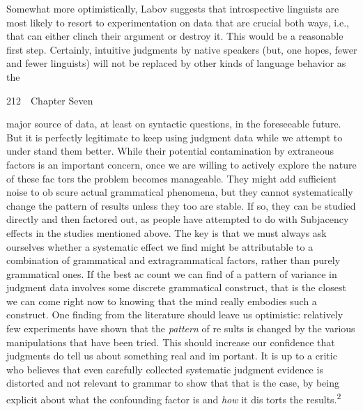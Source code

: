 \begin{styleStandard}
Somewhat more optimistically, Labov suggests that introspective linguists are most likely to resort to experimentation on data that are crucial both ways, i.e., that can either clinch their argument or destroy it. This would be a reasonable first step. Certainly, intuitive judgments by native speakers (but, one hopes, fewer and fewer linguists) will not be replaced by other kinds of language behavior as the
\end{styleStandard}


\clearpage\setcounter{page}{1}\begin{styleStandard}
212\ \ Chapter Seven
\end{styleStandard}


\begin{styleStandard}
major source of data, at least on syntactic questions, in the foreseeable future. But it is perfectly legitimate to keep using judgment data while we attempt to under\- stand them better. While their potential contamination by extraneous factors is an important concern, once we are willing to actively explore the nature of these fac\- tors the problem becomes manageable. They might add sufficient noise to ob\- scure actual grammatical phenomena, but they cannot systematically change the pattern of results unless they too are stable. If so, they can be studied directly and then factored out, as people have attempted to do with Subjacency effects in the studies mentioned above. The key is that we must always ask ourselves whether a systematic effect we find might be attributable to a combination of grammatical and extragrammatical factors, rather than purely grammatical ones. If the best ac\- count we can find of a pattern of variance in judgment data involves some discrete grammatical construct, that is the closest we can come right now to knowing that the mind really embodies such a construct. One finding from the literature should leave us optimistic: relatively few experiments have shown that the \textit{pattern}\textit{ }of re\- sults is changed by the various manipulations that have been tried. This should increase our confidence that judgments do tell us about something real and im\- portant. It is up to a critic who believes that even carefully collected systematic judgment evidence is distorted and not relevant to grammar to show that that is the case, by being explicit about what the confounding factor is and \textit{how}\textit{ }it dis\- torts the results.\textsuperscript{2}
\end{styleStandard}


